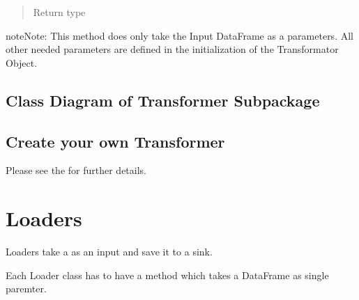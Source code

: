 \documentclass[a4paper,10pt, twoside,english]{sphinxmanual}
\begin{document}
\begin{fulllineitems}
\begin{fulllineitems}
\begin{quote}
\begin{description}
\item[{Return type}] \leavevmode
{}

\end{description}\end{quote}

\begin{sphinxadmonition}{note}{Note:}
This method does only take the Input DataFrame as a parameters. All other needed parameters
are defined in the initialization of the Transformator Object.
\end{sphinxadmonition}

\end{fulllineitems}


\end{fulllineitems}



\subsection{Class Diagram of Transformer Subpackage}
\label{\detokenize{transformer/overview:class-diagram-of-transformer-subpackage}}
\noindent{}


\subsection{Create your own Transformer}
\label{\detokenize{transformer/overview:create-your-own-transformer}}
Please see the {\hyperref[\detokenize{base_classes/transformer:custom-transformer}]{}} for further details.


\section{Loaders}
\label{\detokenize{loader/overview:module-spooq2.loader.loader}}\label{\detokenize{loader/overview:loaders}}\label{\detokenize{loader/overview::doc}}
Loaders take a  as an input and save it to a sink.

Each Loader class has to have a  method which takes a DataFrame as single paremter.
\end{document}
